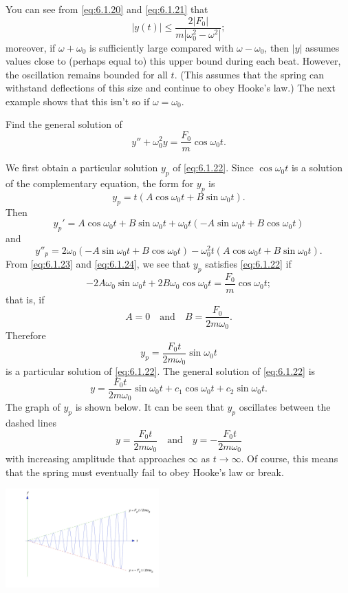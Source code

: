 \documentclass{ximera}
\begin{document}
\begin{example}
\begin{explanation}
 
 
 
You can see from
\eqref{eq:6.1.20} and \eqref{eq:6.1.21} that
$$
|y(t)|\leq\frac{2|F_0|}{m|\omega_0^2-\omega^2|};
$$
moreover, if $\omega+\omega_0$ is sufficiently large compared with $\omega
-\omega_0$, then $|y|$ assumes values close to (perhaps equal to) this
upper bound during each beat. However, the oscillation remains bounded for
all $t$. (This assumes that the spring can withstand
deflections of this size and continue to obey Hooke's law.)  The next
example shows that this isn't  so if $\omega=\omega_0$.
 
\end{explanation}
\end{example}
 
 
 
\begin{example}\label{example:6.1.5}
Find the general solution of
\begin{equation}\label{eq:6.1.22}
y''+\omega_0^2y=\frac{F_0}{m}\cos\omega_0t.
\end{equation}
 
\begin{explanation}
We first obtain a particular solution $y_p$ of \eqref{eq:6.1.22}. Since
$\cos\omega_0t$ is a solution of the complementary equation, the form
for $y_p$ is
\begin{equation}\label{eq:6.1.23}
y_p=t(A\cos\omega_0t+B\sin\omega_0t).
\end{equation}
 Then
$$
y_p'=A\cos\omega_0t+B\sin\omega_0t
+\omega_0t(-A\sin\omega_0t+B\cos\omega_0t)
$$
and
\begin{equation}\label{eq:6.1.24}
y''_p=2\omega_0(-A\sin\omega_0t
+B\cos\omega_0t)-\omega_0^2t(A\cos\omega_0t+B\sin\omega_0t).
\end{equation}
From \eqref{eq:6.1.23} and \eqref{eq:6.1.24}, we see that $y_p$ satisfies
\eqref{eq:6.1.22} if
$$
-2A\omega_0\sin\omega_0t+2B\omega_0\cos\omega_0t=\frac{F_0}{m}
\cos\omega_0t;
$$
that is, if
$$
A=0\quad\mbox{and}\quad B=\frac{F_0}{2m\omega_0}.
$$
Therefore
$$
y_p=\frac{F_0t}{2m\omega_0}\sin\omega_0t
$$
is a particular solution of \eqref{eq:6.1.22}. The general solution of
 \eqref{eq:6.1.22} is
$$
y=\frac{F_0t}{2m\omega_0}\sin\omega_0t+c_1\cos\omega_0t+c_2\sin\omega_0t.
$$
The graph of $y_p$ is shown below.  It can be
seen that $y_p$ oscillates between the dashed lines
$$
y=\frac{F_0t}{2m\omega_0}\quad\mbox{and}\quad y=-\frac{F_0t}{2m\omega_0}
$$
with increasing amplitude that approaches $\infty$ as $t\rightarrow\infty$. Of
course, this means that the spring must eventually fail to obey Hooke's law
or break.
\begin{image}
  \includegraphics[height=1.5in]{fig060107.jpg}
\end{image}
\end{explanation}
\end{example}
 
\end{document}
